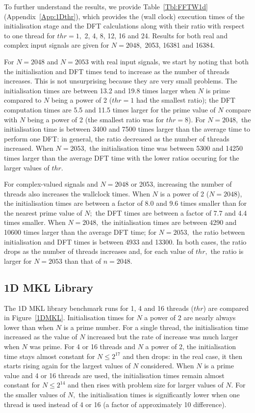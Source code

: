 \documentclass[a4paper]{article}
\begin{document}
To further understand the results, we provide Table~\ref{Tbl:FFTW1d}
(Appendix~\ref{App:1Dthr}), which provides the (wall clock) execution
times of the initialisation stage and the DFT calculations along with
their ratio with respect to one thread for $thr=1,$ 2, 4, 8, 12, 16
and 24. Results for both real and complex input signals are given for
$N=2048,$ 2053, 16381 and 16384.

For $N=2048$ and $N=2053$ with real input signals, we start by
noting that both the initialisation and DFT times tend to increase as
the number of threads increases. This is not unsurprising because they
are very small problems. The
initialisation times are between 13.2 and 19.8 times larger when $N$
is prime compared to $N$ being a power of 2 ($thr=1$ had the smallest
ratio); the DFT computation times are 5.5 and 11.5 times larger for
the prime value of $N$ compare with $N$ being a power of 2 (the
smallest ratio was for $thr=8$). For $N=2048,$ the initialisation time
is between 3400 and 7500 times larger than the average time to perform
one DFT: in general, the ratio decreased as the number of threads
increased. When $N=2053,$ the initialisation time was between 5300 and
14250 times larger than the average DFT time with the lower ratios
occuring for the larger values of $thr.$

For complex-valued signals and $N=2048$ or 2053, increasing the number
of threads also increases the wallclock times. When $N$ is a power of
2 ($N=2048$), the initialisation times are between a factor of 8.0 and
9.6 times smaller than for the nearest prime value of $N;$ the DFT
times are between a factor of 7.7 and 4.4 times smaller. When
$N=2048,$ the initialisation times are between 4290 and 10600 times
larger than the average DFT time; for $N=2053,$ the ratio between
initialisation and DFT times is between 4933 and 13300. In both cases,
the ratio drops as the number of threads increases and, for each value
of $thr,$ the ratio is larger for $N=2053$ than that of $n=2048.$






\subsection{1D MKL Library}\label{Sec:1DMKL}

The 1D MKL library benchmark runs for 1, 4 and 16 threads ($thr$) are compared
in Figure~\ref{1DMKL}. Initialisation times for $N$ a power of 2 are
nearly always lower than when $N$ is a prime number. For a single
thread, the initialisation time increased as the value of $N$
increased but the rate of increase was much larger when $N$ was
prime. For 4 or 16 threads and $N$ a power of 2, the initialisation
time stays almost constant for $N\le 2^{17}$ and then drops: in the
real case, it then starts rising again for the largest values of $N$
considered. When $N$ is a prime value and 4 or 16 threads are used,
the initialisation times remain almost constant for $N\le 2^{14}$ and
then rises with problem size for larger values of $N.$ For the smaller
values of $N,$ the initialisation times is significantly lower when
one thread is used instead of 4 or 16 (a factor of approximately 10
difference).
\end{document}
